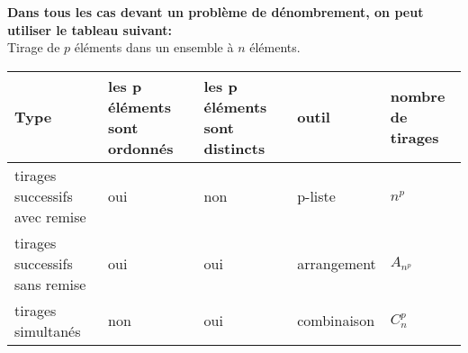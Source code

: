  \textbf{Dans tous les cas devant un problème de dénombrement, on peut  utiliser le tableau suivant:}\\
 Tirage de $p$ éléments dans un ensemble à $n$ éléments.
 \begin{center}
 \setlength\arrayrulewidth{1.2pt}
 \begin{tabularx}{\textwidth}{|X|X|X|X|X|}
\hline
Type & les p éléments sont ordonnés&  les p éléments sont distincts& outil&nombre de tirages\\
\hline
tirages successifs avec remise  &   oui  & non &p-liste & $ n^{p} $ \\
\hline
tirages successifs sans remise  &  oui&   oui &  arrangement& $ A_{n^{p}} $\\
\hline
tirages simultanés \par & non  & oui &combinaison& $C_{n}^{p}$\\
\hline
\end{tabularx}
\end{center}

